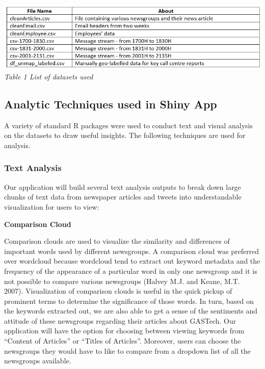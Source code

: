 \documentclass{acm_proc_article-sp}
\begin{document}
\includegraphics{img/table01.png} \emph{Table 1 List of datasets used}

\hypertarget{analytic-techniques-used-in-shiny-app}{%
\subsection{Analytic Techniques used in Shiny
App}\label{analytic-techniques-used-in-shiny-app}}

A variety of standard R packages were used to conduct text and visual
analysis on the datasets to draw useful insights. The following
techniques are used for analysis.

\hypertarget{text-analysis}{%
\subsubsection{Text Analysis}\label{text-analysis}}

Our application will build several text analysis outputs to break down
large chunks of text data from newspaper articles and tweets into
understandable visualization for users to view:

\textbf{Comparison Cloud}

Comparison clouds are used to visualize the similarity and differences
of important words used by different newsgroups. A comparison cloud was
preferred over wordcloud because wordcloud tend to extract out keyword
metadata and the frequency of the appearance of a particular word in
only one newsgroup and it is not possible to compare various newsgroups
(Halvey M.J. and Keane, M.T. 2007). Visualization of comparison clouds
is useful in the quick pickup of prominent terms to determine the
significance of those words. In turn, based on the keywords extracted
out, we are also able to get a sense of the sentiments and attitude of
these newsgroups regarding their articles about GASTech. Our application
will have the option for choosing between viewing keywords from
``Content of Articles'' or ``Titles of Articles''. Moreover, users can
choose the newsgroups they would have to like to compare from a dropdown
list of all the newsgroups available.
\end{document}

